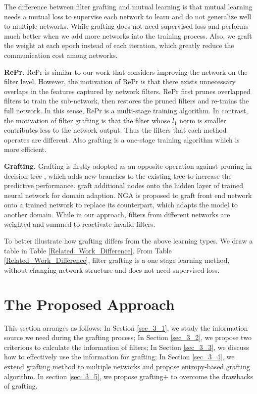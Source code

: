 \documentclass{article}
\begin{document}
The difference between filter grafting and mutual learning is that mutual learning needs a mutual loss to supervise each network to learn and do not generalize well to multiple networks. While grafting does not need supervised loss and performs much better when we add more networks into the training process. Also, we graft the weight at each epoch instead of each iteration, which greatly reduce the communication cost among networks. 


\textbf{RePr.} RePr \cite{prakash2019repr} is similar to our work that considers improving the network on the filter level. However, the motivation of RePr is that there exists unnecessary overlaps in the features captured by network filters. RePr first prunes overlapped filters to train the sub-network, then restores the pruned filters and re-trains the full network. In this sense, RePr is a multi-stage training algorithm. In contrast, the motivation of filter grafting is that the filter whose $l_{1}$ norm is smaller contributes less to the network output. Thus the filters that each method operates are different. Also grafting is a one-stage training algorithm which is more efficient. 

\textbf{Grafting.} Grafting is firstly adopted as an opposite operation against pruning in decision tree \cite{webb1997decision}, which adds new branches to the existing tree to increase the predictive performance. \cite{li2012network} graft additional nodes onto the hidden layer of trained neural network for domain adaption. NGA \cite{hu2020exploiting} is proposed to graft front end network onto a trained network to replace its counterpart, which adapts the model to another domain. While in our approach, filters from different networks are weighted and summed to reactivate invalid filters. 

To better illustrate how grafting differs from the above learning types. We draw a table in Table \ref{Related_Work_Difference}. From Table \ref{Related_Work_Difference}, filter grafting is a one stage learning method, without changing network structure and does not need supervised loss. 


\section{The Proposed Approach}\label{sec_3}

This section arranges as follows: In Section \ref{sec_3_1}, we study the information source we need during the grafting process; In Section \ref{sec_3_2}, we propose two criterions to calculate the information of filters; In Section \ref{sec_3_3}, we discuss how to effectively use the information for grafting; In Section \ref{sec_3_4}, we extend grafting method to multiple networks and propose entropy-based grafting algorithm. In section \ref{sec_3_5}, we propose grafting+ to overcome the drawbacks of grafting.
\end{document}
